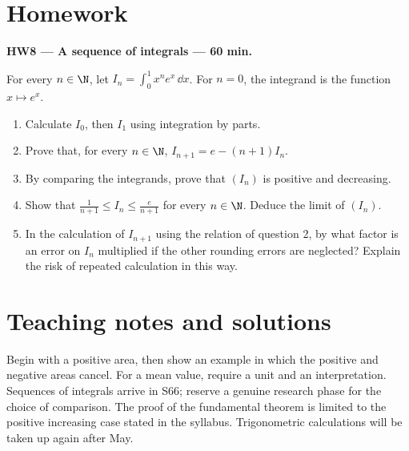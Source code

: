 \mxnewpage
\section{Homework}\textbf{HW8 --- A sequence of integrals --- 60 min.}\par For every $n\in\N$, let $I_n=\displaystyle\int_0^1x^ne^x\,\dd x$. For $n=0$, the integrand is the function $x\mapsto e^x$.
\begin{enumerate}\item Calculate $I_0$, then $I_1$ using integration by parts.
\item Prove that, for every $n\in\N$, $I_{n+1}=e-(n+1)I_n$.
\item By comparing the integrands, prove that $(I_n)$ is positive and decreasing.
\item Show that $\frac1{n+1}\le I_n\le\frac e{n+1}$ for every $n\in\N$. Deduce the limit of $(I_n)$.
\item In the calculation of $I_{n+1}$ using the relation of question 2, by what factor is an error on $I_n$ multiplied if the other rounding errors are neglected? Explain the risk of repeated calculation in this way.\end{enumerate}

\ifmxteacher\mxnewpage\section{Teaching notes and solutions}\begin{teachernote}Begin with a positive area, then show an example in which the positive and negative areas cancel. For a mean value, require a unit and an interpretation. Sequences of integrals arrive in S66; reserve a genuine research phase for the choice of comparison. The proof of the fundamental theorem is limited to the positive increasing case stated in the syllabus. Trigonometric calculations will be taken up again after May.\end{teachernote}

